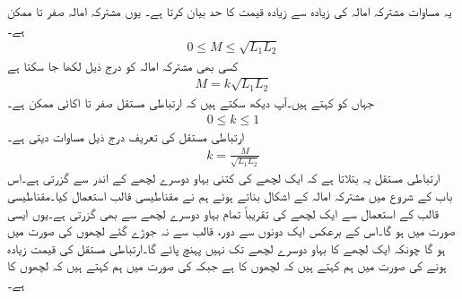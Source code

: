 یہ مساوات مشترکہ امالہ کی زیادہ سے زیادہ قیمت کا حد بیان کرتا ہے۔  یوں مشترکہ امالہ صفر تا  ممکن ہے۔
\begin{align}
0\le M \le \sqrt{L_1 L_2}
\end{align}
 کسی بھی مشترکہ امالہ کو درج ذیل لکھا جا سکتا ہے
\begin{align}
M=k\sqrt{L_1 L_2}
\end{align}
جہاں  کو  کہتے ہیں۔آپ دیکھ سکتے ہیں کہ ارتباطی مستقل صفر تا اکائی ممکن ہے۔
\begin{align}
0 \le k \le 1
\end{align}
ارتباطی مستقل کی تعریف درج ذیل مساوات دیتی ہے۔
\begin{align}
k=\frac{M}{\sqrt{L_1 L_2}}
\end{align}
ارتباطی مستقل یہ بتلاتا ہے کہ ایک لچھے کی کتنی بہاو دوسرے لچھے کے اندر سے گزرتی ہے۔اس باب کے شروع میں مشترکہ امالہ کے اشکال بناتے ہوئے ہم نے مقناطیسی قالب استعمال کیا۔مقناطیسی قالب کے استعمال سے ایک لچھے کی تقریباً تمام بہاو دوسرے لچھے سے بھی گزرتی ہے۔یوں ایسی صورت میں  ہو گا۔اس کے برعکس ایک دونوں سے دور، قالب سے نہ جوڑے گئے لچھوں کی صورت میں  ہو گا چونکہ ایک لچھے کا بہاو دوسرے لچھے تک نہیں پہنچ پائے گا۔ارتباطی مستقل کی قیمت زیادہ  ہونے کی صورت میں ہم کہتے ہیں کہ لچھوں کا  ہے جبکہ  کی صورت میں ہم کہتے ہیں کہ لچھوں کا  ہے۔    


